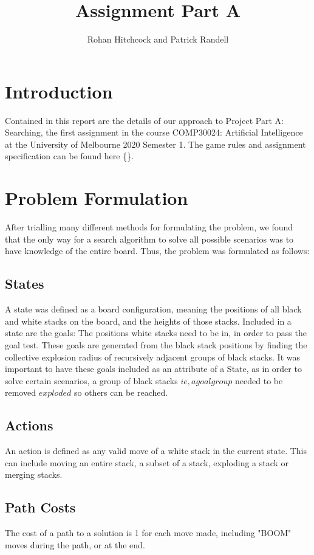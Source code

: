 \documentclass[11pt]{article}
\begin{document}
    \title{\textbf{Assignment Part A}}
    \author{Rohan Hitchcock and Patrick Randell}
    \date{}
    \maketitle

    \section{Introduction}
    Contained in this report are the details of our approach to Project Part A: Searching, the first assignment in the course
    COMP30024: Artificial Intelligence at the University of Melbourne 2020 Semester 1. The game rules and assignment specification
    can be found here \{\}.

    \section{Problem Formulation}
    After trialling many different methods for formulating the problem, we found that the only way for a search algorithm to solve
    all possible scenarios was to have knowledge of the entire board. Thus, the problem was formulated as follows:
    \subsection{States}
    A state was defined as a board configuration, meaning the positions of all black and white stacks on the board, and the heights of those stacks.
    Included in a state are the goals: The positions white stacks need to be in, in order to pass the goal test. These goals are generated
    from the black stack positions by finding the collective explosion radius of recursively adjacent groups of black stacks. It was important to have
    these goals included as an attribute of a State, as in order to solve certain scenarios, a group of black stacks \(ie, a goal group\) needed to be
    removed \(exploded\) so others can be reached.
    \subsection{Actions}
    An action is defined as any valid move of a white stack in the current state. This can include moving an entire stack, a subset of a stack,
    exploding a stack or merging stacks.
    \subsection{Path Costs}
    The cost of a path to a solution is 1 for each move made, including "BOOM" moves during the path, or at the end.
\end{document}
